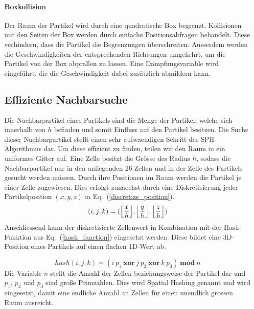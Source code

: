 \documentclass[a4paper]{paper}
\renewcommand{\eqref}[1]{Eq.~(\ref{#1})}
\DeclarePairedDelimiter\floor{\lfloor}{\rfloor}
\begin{document}
\paragraph{Boxkollision} Der Raum der Partikel wird durch eine quadratische Box begrenzt. Kollisionen mit den Seiten der Box werden durch einfache Positionsabfragen behandelt. Diese verhindern, dass die Partikel die Begrenzungen überschreiten. Ausserdem werden die Geschwindigkeiten der entsprechenden Richtungen umgekehrt, um die Partikel von der Box abprallen zu lassen. Eine Dämpfungsvariable wird eingeführt, die die Geschwindigkeit dabei zusätzlich abmildern kann.

\subsection{Effiziente Nachbarsuche}

Die Nachbarpartikel eines Partikels sind die Menge der Partikel, welche sich innerhalb von $h$ befinden und somit Einfluss auf den Partikel besitzen. Die Suche dieser Nachbarpartikel stellt einen sehr aufwaendigen Schritt des SPH-Algorithmus dar. Um diese effizient zu finden, teilen wir den Raum in ein uniformes Gitter auf. Eine Zelle besitzt die Grösse des Radius $h$, sodass die Nachbarpartikel nur in den anliegenden 26 Zellen und in der Zelle des Partikels gesucht werden müssen. Durch ihre Positionen im Raum werden die Partikel je einer Zelle zugewiesen. Dies erfolgt zunaechst durch eine Diskretisierung jeder Partikelposition $(x,y,z)$ in \eqref{discretize_position}. 
\begin{equation}
\label{discretize_position}
(i, j, k) = (\floor*{\frac{x}{h}}, \floor*{\frac{y}{h}}, \floor*{\frac{z}{h}})
\end{equation}
Anschliessend kann der diskretisierte Zellenwert in Kombination mit der Hash-Funktion aus \eqref{hash_function} eingesetzt werden. Diese bildet eine 3D-Position eines Partikels auf einen flachen 1D-Wert ab.

\begin{equation}
\label{hash_function}
hash(i,j,k) = (i\ p_1 \ \boldsymbol{xor} \ j\ p_2\ \boldsymbol{xor}\ k\ p_3)\ \boldsymbol{mod}\ n
\end{equation}
Die Variable $n$ stellt die Anzahl der Zellen beziehungsweise der Partikel dar und $p_1$, $p_2$ und $p_3$ sind große Primzahlen. Dies wird Spatial Hashing genannt und wird eingesetzt, damit eine endliche Anzahl an Zellen für einen unendlich grossen Raum ausreicht. \citep{muller2003optimized}
\end{document}
